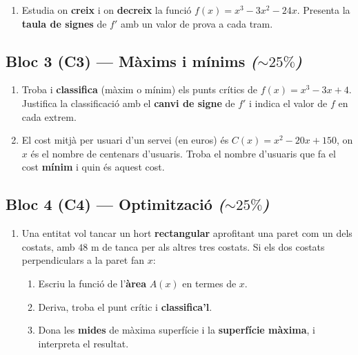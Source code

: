 \begin{enumerate}[label=\textbf{\arabic*.}, leftmargin=2em, itemsep=7pt, start=2]
  \item Estudia on \textbf{creix} i on \textbf{decreix} la funció
        $f(x)=x^3-3x^2-24x$. Presenta la \textbf{taula de signes} de $f'$ amb un valor
        de prova a cada tram.
\end{enumerate}

\subsection*{Bloc 3 (C3) — Màxims i mínims \hfill \normalfont\itshape ($\sim 25\%$)}

\begin{enumerate}[label=\textbf{\arabic*.}, leftmargin=2em, itemsep=7pt, start=3]
  \item Troba i \textbf{classifica} (màxim o mínim) els punts crítics de
        $f(x)=x^3-3x+4$. Justifica la classificació amb el \textbf{canvi de signe} de
        $f'$ i indica el valor de $f$ en cada extrem.
  \item El cost mitjà per usuari d'un servei (en euros) és $C(x)=x^2-20x+150$, on $x$
        és el nombre de centenars d'usuaris. Troba el nombre d'usuaris que fa el cost
        \textbf{mínim} i quin és aquest cost.
\end{enumerate}

\subsection*{Bloc 4 (C4) — Optimització \hfill \normalfont\itshape ($\sim 25\%$)}

\begin{enumerate}[label=\textbf{\arabic*.}, leftmargin=2em, itemsep=7pt, start=5]
  \item Una entitat vol tancar un hort \textbf{rectangular} aprofitant una paret com un
        dels costats, amb $48$ m de tanca per als altres tres costats. Si els dos
        costats perpendiculars a la paret fan $x$:
        \begin{enumerate}[label=\alph*), leftmargin=1.6em, topsep=2pt, itemsep=2pt]
          \item Escriu la funció de l'\textbf{àrea} $A(x)$ en termes de $x$.
          \item Deriva, troba el punt crític i \textbf{classifica'l}.
          \item Dona les \textbf{mides} de màxima superfície i la \textbf{superfície
                màxima}, i interpreta el resultat.
        \end{enumerate}
\end{enumerate}

